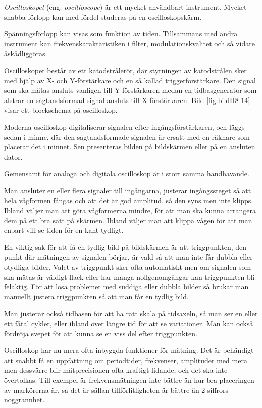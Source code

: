 \emph{Oscilloskopet} (eng. \emph{oscilloscope}) är ett mycket användbart
instrument.
Mycket snabba förlopp kan med fördel studeras på en oscilloskopskärm.

Spänningsförlopp kan visas som funktion av tiden.
Tillsammans med andra instrument kan frekvenskaraktäristiken i filter,
modulationskvalitet och så vidare åskådliggöras.

Oscilloskopet består av ett katodstrålerör, där styrningen av katodstrålen sker
med hjälp av X- och Y-förstärkare och en så kallad triggerförstärkare.
Den signal som ska mätas ansluts vanligen till Y-förstärkaren medan en
tidbasgenerator som alstrar en sågtandsformad signal ansluts till X-förstärkaren.
Bild \ref{fig:bildII8-14} visar ett blockschema på oscilloskop.

Moderna oscilloskop digitaliserar signalen efter ingångsförstärkaren,
och läggs sedan i minne, där den sågtandsformade signalen är ersatt med en
räknare som placerar det i minnet.
Sen presenteras bilden på bildskärmen eller på en ansluten dator.

Gemensamt för analoga och digitala oscilloskop är i stort samma handhavande.

Man ansluter en eller flera signaler till ingångarna, justerar ingångssteget
så att hela vågformen fångas och att det är god amplitud, så den syns men inte
klipps.
Ibland väljer man att göra vågformerna mindre, för att man ska kunna
arrangera dem på ett bra sätt på skärmen.
Ibland väljer man att klippa vågen för att man enbart vill se tiden för en
kant tydligt.

En viktig sak för att få en tydlig bild på bildskärmen är att triggpunkten,
den punkt där mätningen av signalen börjar, är vald så att man inte får dubbla
eller otydliga bilder.
Valet av triggpunkt sker ofta automatiskt men om signalen som ska mätas är
väldigt flack eller har många nollgenomgångar kan triggpunkten bli felaktig.
För att lösa problemet med suddiga eller dubbla bilder så brukar man manuellt
justera triggpunkten så att man får en tydlig bild.

Man justerar också tidbasen för att ha rätt skala på tidsaxeln, så man ser en
eller ett fåtal cykler, eller ibland över längre tid för att se variationer.
Man kan också fördröja svepet för att kunna se en viss del efter triggpunkten.

Oscilloskop har nu mera ofta inbyggda funktioner för mätning.
Det är behändigt att snabbt få en uppfattning om periodtider, frekvenser,
amplituder med mera men dessvärre blir mätprecisionen ofta kraftigt lidande,
och det ska inte övertolkas.
Till exempel är frekvensmätningen inte bättre än hur bra placeringen av markörerna är,
så det är sällan tillförlitligheten är bättre än 2 siffrors noggrannhet.

